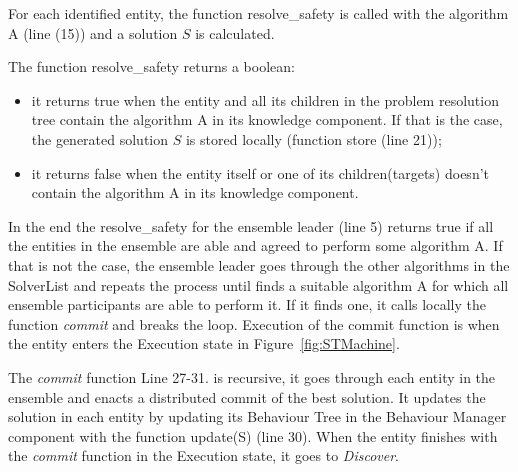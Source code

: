 \documentclass[journal]{IEEEtran}
\theoremstyle{definition}
\begin{document}
For each identified entity, the function resolve\_safety is called with the algorithm A (line (15)) 
and a solution $S$ is calculated. 

The function resolve\_safety returns a boolean: 
\begin{itemize}
\item it returns true when the entity and all its children in the problem resolution tree contain the algorithm A in its knowledge component.  If that is the case, the generated solution $S$ is stored locally (function store (line 21));
\item it returns false when the entity itself or one of its children(targets) doesn't contain the algorithm A in its knowledge component.
\end{itemize}

In the end the resolve\_safety for the ensemble leader (line 5) returns true if all the entities in the ensemble are able and agreed to perform some algorithm A. If that is not the case, the ensemble leader goes through the other algorithms in the SolverList and repeats the process until finds a suitable algorithm A for which all ensemble participants are able to perform it. If it finds one, it calls locally the function \textit{commit} and breaks the loop. Execution of the commit function is when the entity enters the Execution state in Figure~\ref{fig:STMachine}.

The \textit{commit} function 
{Line 27-31.} is recursive, it goes through each entity in the ensemble and enacts a distributed commit of the best solution. It updates the solution in each entity by updating its Behaviour Tree in the Behaviour Manager component with the function update(S) (line 30).
When the entity finishes with the \textit{commit} function in the Execution state, it goes to \textit{Discover}.


\end{document}
